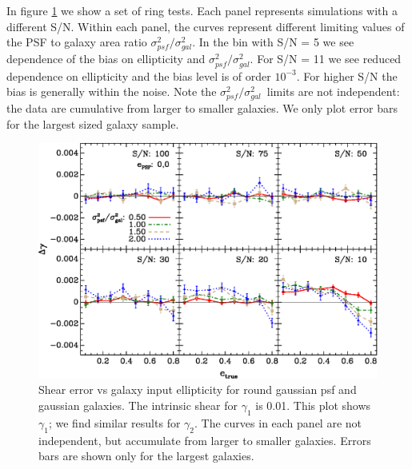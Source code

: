 \documentclass[12pt,preprint]{aastex}
\newcommand{\aratio}{\ensuremath{\sigma^2_{psf}/\sigma^2_{gal}}}
\newcommand{\Rshear}{\ensuremath{\mathcal{R}}}
\newcommand{\rfracerr}{\ensuremath{\Delta \Rshear/\Rshear}}
\begin{document}
In figure \ref{fig:set-e-gg01} we show a set of ring tests.  Each panel
represents simulations with a different S/N.  Within each panel, the curves
represent different limiting values of the PSF to galaxy area ratio \aratio.
In the bin with S/N = 5 we see dependence of the bias on ellipticity and
\aratio.  For S/N = 11 we see reduced dependence on ellipticity and the bias
level is of order $10^{-3}$.  For higher S/N the bias is generally within the
noise.  Note the \aratio\ limits are not independent: the data are cumulative
from larger to smaller galaxies.  We only plot error bars for the largest
sized galaxy sample.

\begin{figure}[t] \centering
 \centering 
 \includegraphics[scale=1]{figures/set-e-gg01-yr-0.005-0.005-vs-e.eps}

 \caption{Shear error vs galaxy input ellipticity for round gaussian psf
 and gaussian galaxies. The intrinsic shear for $\gamma_1$ is 0.01.  This plot
 shows $\gamma_1$; we find similar results for $\gamma_2$.  The curves in each
 panel are not independent, but accumulate from larger to smaller galaxies.
 Errors bars are shown only for the largest galaxies.
 \label{fig:set-e-gg01}}

\end{figure}

\end{document}
